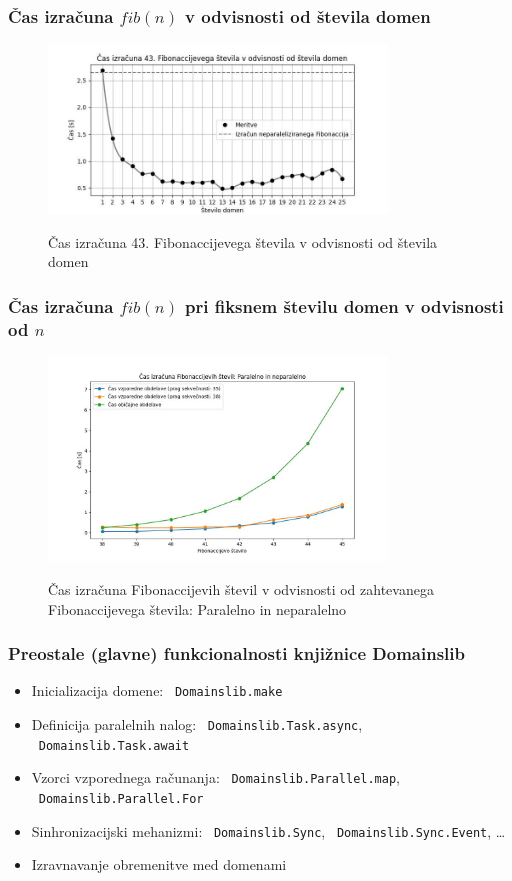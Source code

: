 \documentclass{beamer}
\begin{document}
\begin{frame}
    \frametitle{Čas izračuna $fib(n)$ v odvisnosti od števila domen}
    \begin{figure}
        \centering
        \caption{Čas izračuna 43. Fibonaccijevega števila v odvisnosti od števila domen}
        \includegraphics[width=9cm]{slike/fib_par_v_odvisnosti_od_domen.jpg}
        \label{fig:fib_par_v_odvisnosti_od_domen}
      \end{figure}
\end{frame}

\begin{frame}
    \frametitle{Čas izračuna $fib(n)$ pri fiksnem številu domen v odvisnosti od $n$}
    \begin{figure}
        \centering
        \caption{Čas izračuna Fibonaccijevih števil v odvisnosti od zahtevanega Fibonaccijevega števila: Paralelno in neparalelno}
        \includegraphics[width=9cm]{slike/fib_par_v_odvisnosti_od_n.jpg}
        \label{fig:fib_par_v_odvisnosti_od_n}
      \end{figure}
\end{frame}

\begin{frame}
  \frametitle{Preostale (glavne) funkcionalnosti knjižnice Domainslib}
  \begin{itemize}
        \item Inicializacija domene: ~\texttt{Domainslib.make}
        \item Definicija paralelnih nalog: ~\texttt{Domainslib.Task.async}, ~\texttt{Domainslib.Task.await}
        \item Vzorci vzporednega računanja: ~\texttt{Domainslib.Parallel.map}, ~\texttt{Domainslib.Parallel.For}
        \item Sinhronizacijski mehanizmi: ~\texttt{Domainslib.Sync}, ~\texttt{Domainslib.Sync.Event}, \dots
        \item Izravnavanje obremenitve med domenami
      \end{itemize}
\end{frame}
    
\end{document}
